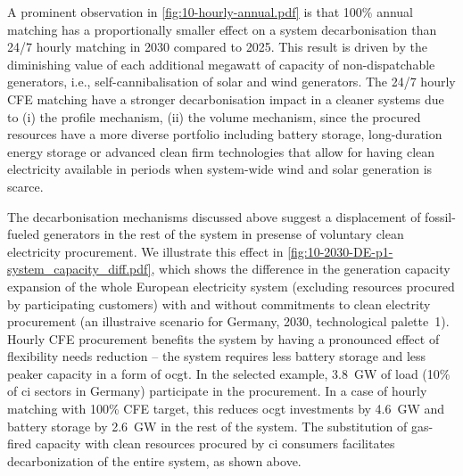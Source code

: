 A prominent observation in \cref{fig:10-hourly-annual.pdf} is that 100\% annual matching has a proportionally smaller effect on a system decarbonisation than 24/7 hourly matching in 2030 compared to 2025. 
This result is driven by the diminishing value of each additional megawatt of capacity of non-dispatchable generators, i.e., self-cannibalisation of solar and wind generators. 
The 24/7 hourly CFE matching have a stronger decarbonisation impact in a cleaner systems due to (i) the profile mechanism, (ii) the volume mechanism, since the procured resources have a more diverse portfolio including battery storage, long-duration energy storage or advanced clean firm technologies that allow for having clean electricity available in periods when system-wide wind and solar generation is scarce.

The decarbonisation mechanisms discussed above suggest a displacement of fossil-fueled generators in the rest of the system in presense of voluntary clean electricity procurement.
We illustrate this effect in \cref{fig:10-2030-DE-p1-system_capacity_diff.pdf}, which shows the difference in the generation capacity expansion of the whole European electricity system (excluding resources procured by participating customers) with and without commitments to clean electrity procurement (an illustraive scenario for Germany, 2030, technological palette~1). 
Hourly CFE procurement benefits the system by having a pronounced effect of flexibility needs reduction -- the system requires less battery storage and less peaker capacity in a form of \gls{ocgt}. 
In the selected example, 3.8~GW of load (10\% of \gls{ci} sectors in Germany) participate in the procurement.
In a case of hourly matching with 100\% CFE target, this reduces \gls{ocgt} investments by 4.6~GW and battery storage by 2.6~GW in the rest of the system.
The substitution of gas-fired capacity with clean resources procured by \gls{ci} consumers facilitates decarbonization of the entire system, as shown above.



